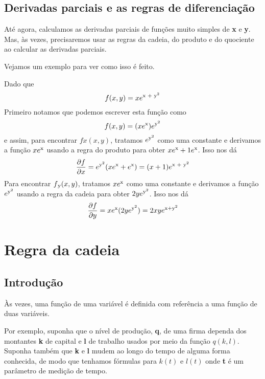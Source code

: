\documentclass[a4paper]{article}
\begin{document}
\subsection*{Derivadas parciais e as regras de diferenciação}
Até agora, calculamos as derivadas parciais de funções muito simples de \textbf{x} e \textbf{y}. Mas, às vezes, precisaremos usar as regras da cadeia, do produto e do quociente ao calcular as derivadas parciais.

\par Vejamos um exemplo para ver como isso é feito.
\par Dado que
\begin{equation}
    f(x,y) = xe\textsuperscript{x + y\textsuperscript{2}} 
\end{equation}
Primeiro notamos que podemos escrever esta função como
\begin{equation}
    f(x,y) = (xe\textsuperscript{x})e\textsuperscript{y\textsuperscript{2}}
\end{equation}
e assim, para encontrar $fx(x,y)$, tratamos $e\textsuperscript{y\textsuperscript{2}}$ como uma constante e derivamos a função $xe\textsuperscript{x}$ usando a regra do produto para obter $xe\textsuperscript{x} + 1e\textsuperscript{x}$. Isso nos dá
\begin{equation}
    \frac{\partial f}{\partial x} = e\textsuperscript{y\textsuperscript{2}}(xe\textsuperscript{x} + e\textsuperscript{x}) = (x + 1)e\textsuperscript{x + y\textsuperscript{2}}
\end{equation}
Para encontrar $f\textsubscript{y}(x,y)$, tratamos $xe\textsuperscript{x}$ como uma constante e derivamos a função $e\textsuperscript{y\textsuperscript{2}}$ usando a regra da cadeia para obter $2ye\textsuperscript{y\textsuperscript{2}}$. Isso nos dá
\begin{equation}
    \frac{\partial f}{\partial y} = xe\textsuperscript{x}(2ye\textsuperscript{y\textsuperscript{2}}) = 2xye\textsuperscript{x+y\textsuperscript{2}}
\end{equation}
\section{Regra da cadeia}
\subsection*{Introdução}
Às vezes, uma função de uma variável é definida com referência a uma função de duas variáveis.

\par Por exemplo, suponha que o nível de produção, \textbf{q}, de uma firma dependa dos montantes \textbf{k} de capital e \textbf{l} de trabalho usados por meio da função $q(k,l)$. Suponha também que \textbf{k} e \textbf{l} mudem ao longo do tempo de alguma forma conhecida, de modo que tenhamos fórmulas para $k(t)$ e $l(t)$ onde \textbf{t} é um parâmetro de medição de tempo.
\end{document}
